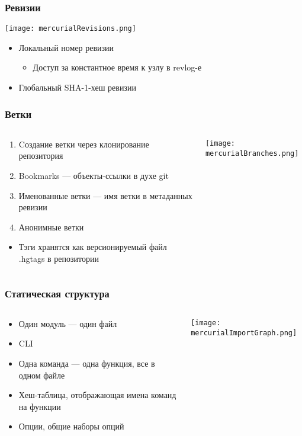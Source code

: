 \documentclass{../../slides-style}
\begin{document}
	\begin{frame}
		\frametitle{Ревизии}
		\begin{center}
			\texttt{[image: mercurialRevisions.png]}
		\end{center}
		\begin{itemize}
			\item Локальный номер ревизии
			\begin{itemize}
				\item Доступ за константное время к узлу в revlog-е
			\end{itemize}
			\item Глобальный SHA-1-хеш ревизии
		\end{itemize}
	\end{frame}

	\begin{frame}
		\frametitle{Ветки}
		\begin{columns}
			\begin{column}{0.6\textwidth}
				\begin{enumerate}
					\item Cоздание ветки через клонирование репозитория
					\item Bookmarks --- объекты-ссылки в духе git
					\item Именованные ветки --- имя ветки в метаданных ревизии
					\item Анонимные ветки
				\end{enumerate}
				\begin{itemize}
					\item Тэги хранятся как версионируемый файл .hgtags в репозитории
				\end{itemize}
			\end{column}
			\begin{column}{0.4\textwidth}
				\texttt{[image: mercurialBranches.png]}
			\end{column}
		\end{columns}
	\end{frame}

	\begin{frame}
		\frametitle{Статическая структура}
		\begin{columns}
			\begin{column}{0.4\textwidth}
				\begin{itemize}
					\item Один модуль --- один файл
					\item CLI
					\item Одна команда --- одна функция, все в одном файле
					\item Хеш-таблица, отображающая имена команд на функции
					\item Опции, общие наборы опций
				\end{itemize}
			\end{column}
			\begin{column}{0.6\textwidth}
				\texttt{[image: mercurialImportGraph.png]}
			\end{column}
		\end{columns}
	\end{frame}
\end{document}
